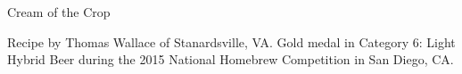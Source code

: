 \begin{recipe}{Cream of the Crop}

\begin{aboutblock}
Recipe by Thomas Wallace of Stanardsville, VA. Gold medal in Category 6: Light
Hybrid Beer during the 2015 National Homebrew Competition in San Diego, CA.
\sourceaha
\end{aboutblock}


\begin{methodandtiming}

\begin{mashsteps}
\end{mashsteps}

\begin{fermentationsteps}
\end{fermentationsteps}

\end{methodandtiming}

\recipebreak

\begin{ingredientsblock}

\begin{malts}
\end{malts}

\begin{hops}
\end{hops}


\end{ingredientsblock}

\end{recipe}

